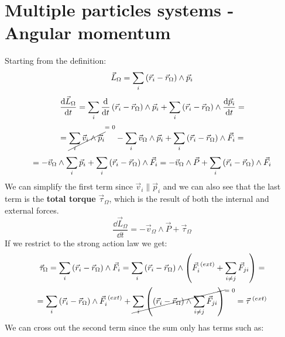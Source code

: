 \section{Multiple particles systems - Angular momentum}
Starting from the definition:
\begin{equation}
    \vec{L}_{\Omega} = \displaystyle\sum_{i}\left(\vec{r}_i-\vec{r}_{\Omega}\right)\wedge\vec{p}_i
\end{equation}
\begin{equation}
    \dfrac{\dd{\vec{L}_{\Omega}}}{\dd{t}} = \displaystyle\sum_{i}\dfrac{\dd{}}{\dd{t}}\left(\vec{r}_i-\vec{r}_{\Omega}\right)\wedge\vec{p}_i + \displaystyle\sum_{i}\left(\vec{r}_i-\vec{r}_{\Omega}\right)\wedge\dfrac{\dd{\vec{p}_i}}{\dd{t}} =
\end{equation}
\begin{equation}
    = \crossout{\bigsum_{i}\vec{v}_i\wedge\vec{p}_i}-\bigsum_{i}\vec{v}_{\Omega}\wedge\vec{p}_i + \bigsum_{i}\brackets{\vec{r}_i-\vec{r}_{\Omega}}\wedge\vec{F}_i =
\end{equation}
\begin{equation}
    = -\vec{v}_{\Omega}\wedge\displaystyle\sum_{i}\vec{p}_i + \displaystyle\sum_{i}\left(\vec{r}_i-\vec{r}_{\Omega}\right)\wedge\vec{F}_i = -\vec{v}_{\Omega}\wedge\vec{P} + \displaystyle\sum_{i}\left(\vec{r}_i-\vec{r}_{\Omega}\right)\wedge\vec{F}_i
\end{equation}
We can simplify the first term since $\vec{v}_i \parallel \vec{p}_i$ and we can also see that the last term is the \textbf{total torque} $\vec{\tau}_{\Omega}$, which is the result of both the internal and external forces.
\begin{equation} \label{e:first_angular_expression}
    \dfrac{\dd{\vec{L}_{\Omega}}}{\dd{t}} = -\vec{v}_{\Omega}\wedge\vec{P} + \vec{\tau}_{\Omega}
\end{equation}
If we restrict to the strong action law we get:
\begin{equation}
    \vec{\tau}_{\Omega} = \displaystyle\sum_{i}\left(\vec{r}_i-\vec{r}_{\Omega}\right)\wedge\vec{F}_i = \displaystyle\sum_{i}\left(\vec{r}_i-\vec{r}_{\Omega}\right)\wedge\left(\vec{F}_i^{\;(ext)}+ \displaystyle\sum_{i\neq j}\vec{F}_{ji}\right) =
\end{equation}
\begin{equation}
    = \bigsum_{i}\brackets{\vec{r}_i-\vec{r}_{\Omega}}\wedge\vec{F}_i^{\;(ext)} + \crossout{\bigsum_{i}\brackets{\brackets{\vec{r}_i-\vec{r}_{\Omega}}\wedge\bigsum_{i\neq j}\vec{F}_{ji}}} = \vec{\tau}^{\;(ext)}
\end{equation}
We can cross out the second term since the sum only has terms such as:
